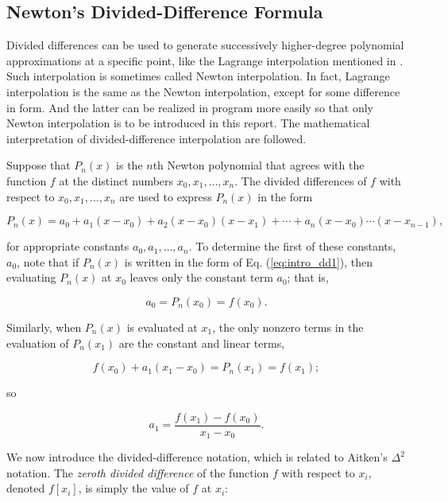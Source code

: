 \documentclass[preprint,12pt]{elsarticle}
\begin{document}
\subsection{Newton's Divided-Difference Formula}
\label{SS:2.1}

Divided differences can be used to generate successively higher-degree polynomial approximations at a specific point, like the Lagrange interpolation mentioned in \cite{burden:2001na}. Such interpolation is sometimes called Newton interpolation. In fact, Lagrange interpolation is the same as the Newton interpolation, except for some difference in form. And the latter can be realized in program more easily so that only Newton interpolation is to be introduced in this report. The mathematical interpretation of divided-difference interpolation are followed.

Suppose that $P_{n}(x)$ is the $n$th Newton polynomial that agrees with the function $f$ at the distinct numbers $x_0,x_1,\dots,x_n$. The divided differences of $f$ with respect to $x_0,x_1,\dots,x_n$ are used to express $P_{n}(x)$ in the form

\begin{equation}
\label{eq:intro_dd1}
    P_{n}(x)=a_{0}+a_{1}(x-x_0)+a_{2}(x-x_0)(x-x_1)+\cdots+a_{n}(x-x_0)\cdots(x-x_{n-1}),
\end{equation}

for appropriate constants $a_0,a_1,\dots,a_n$. To determine the first of these constants, $a_0$, note that if $P_{n}(x)$ is written in the form of Eq. (\ref{eq:intro_dd1}), then evaluating $P_{n}(x)$ at $x_0$ leaves only the constant term $a_0$; that is, 

$$
a_0 = P_{n}(x_0)=f(x_0).
$$

Similarly, when $P_{n}(x)$ is evaluated at $x_1$, the only nonzero terms in the evaluation of $P_n(x_1)$ are the constant and linear terms, 

$$
f(x_0)+a_{1}(x_{1}-x_{0})=P_{n}(x_1)=f(x_1);
$$

so

\begin{equation}
\label{eq:intro_dd2}
    a_{1}=\frac{f(x_1)-f(x_0)}{x_{1}-x_{0}}.
\end{equation}

We now introduce the divided-difference notation, which is related to Aitken’s $\Delta^2$ notation. The \textit{zeroth divided difference} of the function $f$ with respect to $x_i$, denoted $f[x_i]$, is simply the value of $f$ at $x_i$: 
\end{document}
